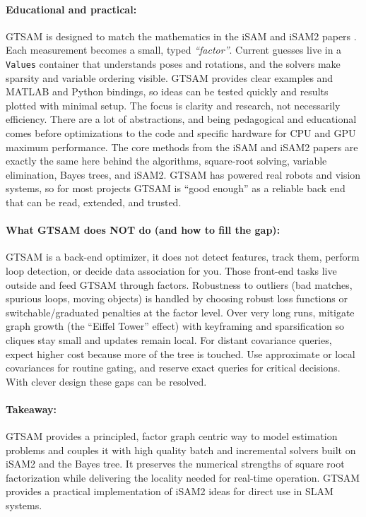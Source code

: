 \paragraph{Educational and practical:}
GTSAM is designed to match the mathematics in the iSAM and iSAM2 papers \cite{iSAM_paper,iSAM2_paper}. Each measurement becomes a small, typed \textit{``factor''}. Current guesses live in a \texttt{Values} container that understands poses and rotations, and the solvers make sparsity and variable ordering visible. GTSAM provides clear examples and MATLAB and Python bindings, so ideas can be tested quickly and results plotted with minimal setup. The focus is clarity and research, not necessarily efficiency. There are a lot of abstractions, and being pedagogical and educational comes before optimizations to the code and specific hardware for CPU and GPU maximum performance. The core methods from the iSAM and iSAM2 papers \cite{iSAM_paper,iSAM2_paper} are exactly the same here behind the algorithms, square-root solving, variable elimination, Bayes trees, and iSAM2. GTSAM has powered real robots and vision systems, so for most projects GTSAM is ``good enough'' as a reliable back end that can be read, extended, and trusted. \cite{GTSAM_handbook}

\paragraph{What GTSAM does NOT do (and how to fill the gap):}
GTSAM is a back-end optimizer, it does not detect features, track them, perform loop detection, or decide data association for you. Those front-end tasks live outside and feed GTSAM through factors. Robustness to outliers (bad matches, spurious loops, moving objects) is handled by choosing robust loss functions or switchable/graduated penalties at the factor level. Over very long runs, mitigate graph growth (the ``Eiffel Tower'' effect) with keyframing and sparsification so cliques stay small and updates remain local. For distant covariance queries, expect higher cost because more of the tree is touched. Use approximate or local covariances for routine gating, and reserve exact queries for critical decisions. With clever design these gaps can be resolved. \cite{GTSAM_handbook}

\paragraph{Takeaway:}
GTSAM provides a principled, factor graph centric way to model estimation problems and couples it with high quality batch and incremental solvers built on iSAM2 and the Bayes tree. It preserves the numerical strengths of square root factorization while delivering the locality needed for real-time operation. GTSAM provides a practical implementation of iSAM2 ideas for direct use in SLAM systems. \cite{GTSAM_handbook}


